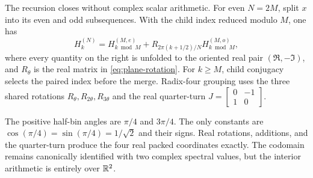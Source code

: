 The recursion closes without complex scalar arithmetic.  For even $N=2M$,
split $x$ into its even and odd subsequences.  With the child index reduced
modulo $M$, one has
\begin{equation}
 H_k^{(N)}=H_{k\bmod M}^{(M,e)}+
 R_{2\pi(k+1/2)/N}H_{k\bmod M}^{(M,o)},
 \label{eq:odft-recursion}
\end{equation}
where every quantity on the right is unfolded to the oriented real pair
$(\Re,-\Im)$, and $R_\theta$ is the real matrix in
\eqref{eq:plane-rotation}.  For $k\ge M$, child conjugacy selects the paired
index before the merge.  Radix-four grouping uses the three shared
rotations $R_\theta,R_{2\theta},R_{3\theta}$ and the real quarter-turn
$J=\left[\begin{smallmatrix}0&-1\\1&0\end{smallmatrix}\right]$.

\begin{example}[$N=4$]
The positive half-bin angles are $\pi/4$ and $3\pi/4$.  The only constants are
$\cos(\pi/4)=\sin(\pi/4)=1/\sqrt2$ and their signs.  Real rotations, additions,
and the quarter-turn produce the four real packed coordinates exactly.  The
codomain remains canonically identified with two complex spectral values, but
the interior arithmetic is entirely over $\mathbb{R}^2$.
\end{example}
